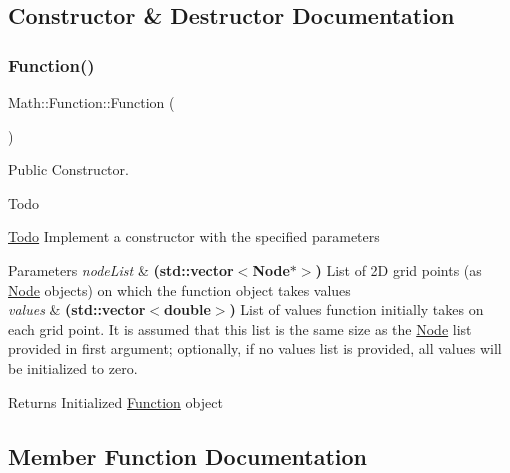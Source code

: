 \subsection{Constructor \& Destructor Documentation}
\mbox{\label{class_math_1_1_function_a97e51108b0374f8adc7982f92af4d0de}} 
\subsubsection{\texorpdfstring{Function()}{Function()}}
{\footnotesize\ttfamily Math\+::\+Function\+::\+Function (\begin{DoxyParamCaption}{ }\end{DoxyParamCaption})\hspace{0.3cm}{\ttfamily [inline]}}



Public Constructor. 

\begin{DoxyRefDesc}{Todo}
\item[\mbox{\hyperlink{todo__todo000004}{Todo}}]Implement a constructor with the specified parameters \end{DoxyRefDesc}

\begin{DoxyParams}{Parameters}
{\em node\+List} & {\bfseries (std\+::vector$<$\+Node$\ast$$>$)} List of 2D grid points (as \mbox{\hyperlink{class_node}{Node}} objects) on which the function object takes values \\
\hline
{\em values} & {\bfseries (std\+::vector$<$double$>$)} List of values function initially takes on each grid point. It is assumed that this list is the same size as the \mbox{\hyperlink{class_node}{Node}} list provided in first argument; optionally, if no values list is provided, all values will be initialized to zero. \\
\hline
\end{DoxyParams}
\begin{DoxyReturn}{Returns}
Initialized \mbox{\hyperlink{class_math_1_1_function}{Function}} object 
\end{DoxyReturn}


\subsection{Member Function Documentation}
\mbox{\label{class_math_1_1_function_ad85e716accc64c1ea4962c828c4e216c}} 
